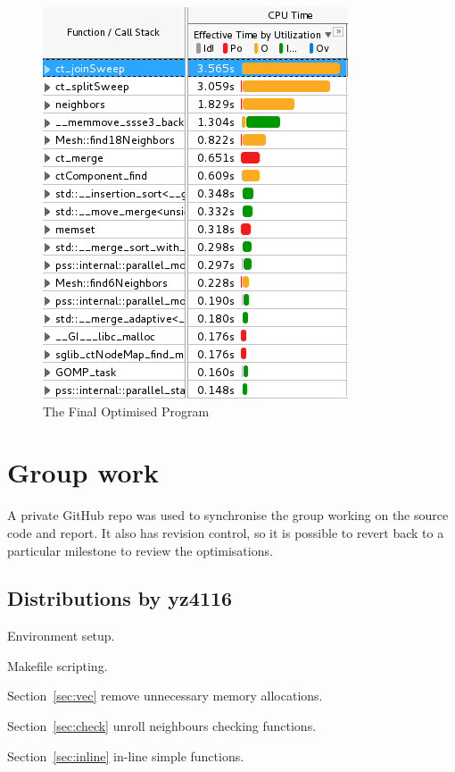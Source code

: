 \documentclass[conference]{IEEEtran}
\newcommand{\sref}[1]{Section~\ref{#1}}
\begin{document}
\begin{figure}[!h]
    \centering
    \includegraphics[width=0.8\columnwidth]{opt_vtune}
    \caption{The Final Optimised Program}
    \label{fig:opt}
\end{figure}


\section{Group work}

A private GitHub repo was used to synchronise the group working on the source code and report. It also has revision control, so it is possible to revert back to a particular milestone to review the optimisations.

\subsection{Distributions by yz4116}

Environment setup.

Makefile scripting.

\sref{sec:vec} remove unnecessary memory allocations.

\sref{sec:check} unroll neighbours checking functions.

\sref{sec:inline} in-line simple functions.
\end{document}
